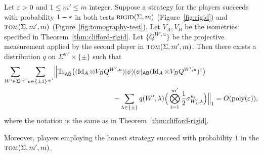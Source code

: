 \begin{corollary}\label{cor:clifford-rigid-adaptive}
Let $\varepsilon>0$ and $1\leq m'\leq m$ integer. Suppose a strategy for the players
  succeeds with probability $1-\varepsilon$ in both tests $\textsc{rigid}(\Sigma,m)$
  (Figure~\ref{fig:rigid}) and $\textsc{tom}(\Sigma,m',m)$
  (Figure~\ref{fig:tomography-test}). Let $V_A,V_B$ be the isometries specified
  in Theorem~\ref{thm:clifford-rigid}. Let $\{Q^{W',u}\}$ be the projective
  measurement applied by the second player in $\textsc{tom}(\Sigma,m',m)$. Then there exists a distribution $q$ on $\Sigma^{m'} \times \{\pm \}$ such that 
\begin{align*}
 \sum_{W'\in\Sigma^{m'}} \sum_{u\in\{\pm1\}^{m'}} &\Big\| \Tr_{\reg{A}\hat{\reg{B}}} \big((\Id_A \otimes V_B Q^{W',u} )\proj{\psi}_{\reg{AB}} (\Id_A \otimes V_B Q^{W',u})^\dagger\big)\\
&\hskip3cm - \sum_{\lambda\in\{\pm\}}  q(W',\lambda)  \Big( \bigotimes_{i=1}^{m'} \frac{1}{2}\sigma_{W'_i,\lambda}^{u_i}\Big) \Big\|_1 = O(\poly(\eps)),
\end{align*}
where the notation is the same as in Theorem~\ref{thm:clifford-rigid}. 

Moreover, players employing the honest strategy succeed with probability $1$ in the
 $\textsc{tom}(\Sigma,m',m)$.
\end{corollary}

